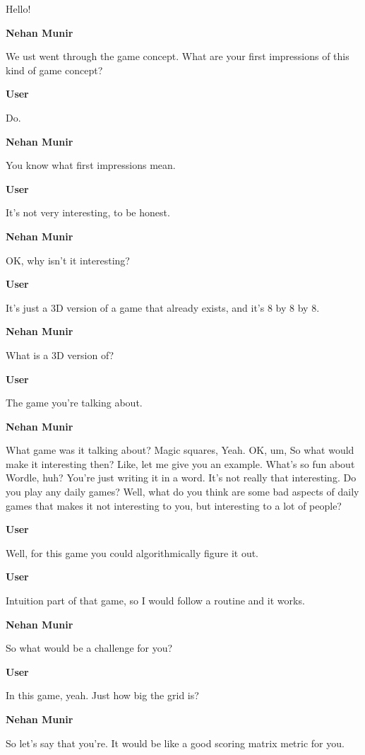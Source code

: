\documentclass{article}
\begin{document}
Hello!

\noindent \textbf{Nehan Munir}

We ust went through the game concept. What are your first impressions of this kind of game concept?

\noindent \textbf{User}

Do.

\noindent \textbf{Nehan Munir}

You know what first impressions mean.

\noindent \textbf{User}

It's not very interesting, to be honest.

\noindent \textbf{Nehan Munir}

OK, why isn't it interesting?

\noindent \textbf{User}

It's just a 3D version of a game that already exists, and it's 8 by 8 by 8.

\noindent \textbf{Nehan Munir}

What is a 3D version of?

\noindent \textbf{User}

The game you're talking about.

\noindent \textbf{Nehan Munir}

What game was it talking about? Magic squares, Yeah. OK, um, So what would make it interesting then? Like, let me give you an example. What's so fun about Wordle, huh? You're just writing it in a word. It's not really that interesting. Do you play any daily games? Well, what do you think are some bad aspects of daily games that makes it not interesting to you, but interesting to a lot of people?

\noindent \textbf{User}

Well, for this game you could algorithmically figure it out.

\noindent \textbf{User}

Intuition part of that game, so I would follow a routine and it works.

\noindent \textbf{Nehan Munir}

So what would be a challenge for you?

\noindent \textbf{User}

In this game, yeah. Just how big the grid is?

\noindent \textbf{Nehan Munir}

So let's say that you're. It would be like a good scoring matrix metric for you.
\end{document}
